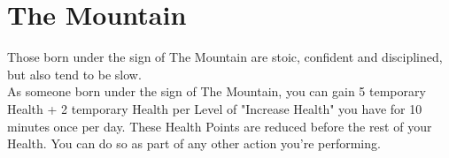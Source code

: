 \section{The Mountain}

Those born under the sign of The Mountain are stoic, confident and disciplined, but also tend to be slow.\\
As someone born under the sign of The Mountain, you can gain 5 temporary Health + 2 temporary Health per Level of "Increase Health" you have for 10 minutes once per day. These Health Points are reduced before the rest of your Health. You can do so as part of any other action you're performing.\\